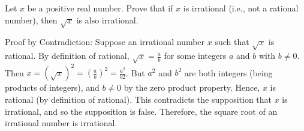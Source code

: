 \question Let $x$ be a positive real number. Prove that if 
$x$ is irrational (i.e., not a rational number), then $\sqrt{x}$ 
is also irrational.

\begin{solution}[3in]
Proof by Contradiction:
Suppose an irrational number $x$ such that $\sqrt{x}$ is rational.
By definition of rational, $\sqrt{x} = \frac{a}{b}$ for some integers 
$a$ and $b$ with $b \neq 0$. Then $x = (\sqrt{x})^2 = (\frac{a}{b})^2 
= \frac{a^2}{b2}$. But $a^2$ and $b^2$ are both integers 
(being products of integers), and $b \neq 0$ by the zero product property. 
Hence, $x$ is rational (by definition of rational). This contradicts the 
supposition that $x$ is irrational, and so the supposition is false. 
Therefore, the square root of an irrational number is irrational.
\end{solution}
